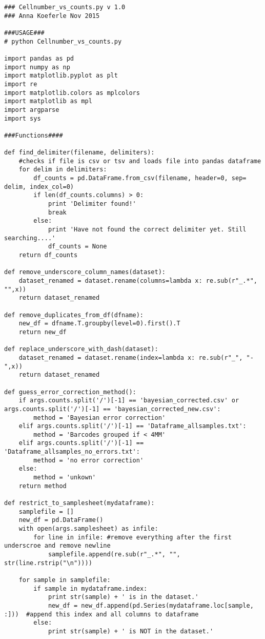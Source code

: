 \begin{footnotesize}
\begin{lstlisting}
### Cellnumber_vs_counts.py v 1.0
### Anna Koeferle Nov 2015

###USAGE###
# python Cellnumber_vs_counts.py

import pandas as pd
import numpy as np
import matplotlib.pyplot as plt
import re
import matplotlib.colors as mplcolors
import matplotlib as mpl
import argparse
import sys

###Functions####

def find_delimiter(filename, delimiters):
    #checks if file is csv or tsv and loads file into pandas dataframe
    for delim in delimiters:
        df_counts = pd.DataFrame.from_csv(filename, header=0, sep= delim, index_col=0)
        if len(df_counts.columns) > 0:
            print 'Delimiter found!'
            break
        else:
            print 'Have not found the correct delimiter yet. Still searching....'
            df_counts = None
    return df_counts

def remove_underscore_column_names(dataset):
    dataset_renamed = dataset.rename(columns=lambda x: re.sub(r"_.*", "",x))
    return dataset_renamed

def remove_duplicates_from_df(dfname):
    new_df = dfname.T.groupby(level=0).first().T
    return new_df

def replace_underscore_with_dash(dataset):
    dataset_renamed = dataset.rename(index=lambda x: re.sub(r"_", "-",x))
    return dataset_renamed

def guess_error_correction_method():
    if args.counts.split('/')[-1] == 'bayesian_corrected.csv' or args.counts.split('/')[-1] == 'bayesian_corrected_new.csv':
        method = 'Bayesian error correction'
    elif args.counts.split('/')[-1] == 'Dataframe_allsamples.txt':
        method = 'Barcodes grouped if < 4MM'
    elif args.counts.split('/')[-1] == 'Dataframe_allsamples_no_errors.txt':
        method = 'no error correction'
    else:
        method = 'unkown'
    return method

def restrict_to_samplesheet(mydataframe):
    samplefile = []
    new_df = pd.DataFrame()
    with open(args.samplesheet) as infile:
        for line in infile: #remove everything after the first underscroe and remove newline
            samplefile.append(re.sub(r"_.*", "", str(line.rstrip("\n"))))

    for sample in samplefile:
        if sample in mydataframe.index:
            print str(sample) + ' is in the dataset.'
            new_df = new_df.append(pd.Series(mydataframe.loc[sample, :]))  #append this index and all columns to dataframe
        else:
            print str(sample) + ' is NOT in the dataset.'


\end{lstlisting}
\end{footnotesize}

